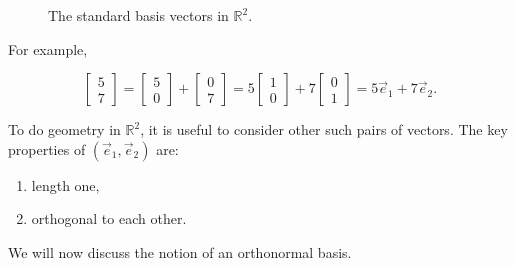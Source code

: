 \begin{figure}[h]
\centering
{}
\caption{The standard basis vectors in $\mathbb{R}^2$.}
\end{figure}

For example,

\[
\begin{bmatrix}
5\\
7
\end{bmatrix}
=
\begin{bmatrix}
5\\
0
\end{bmatrix}
+
\begin{bmatrix}
0\\
7
\end{bmatrix}
=
5
\begin{bmatrix}
1\\
0
\end{bmatrix}
+
7
\begin{bmatrix}
0\\
1
\end{bmatrix}
=
5\vec e_1+7\vec e_2.
\]

To do geometry in $\mathbb{R}^2$, it is useful to consider other such pairs of
vectors. The key properties of $(\vec e_1,\vec e_2)$ are:

\begin{enumerate}
  \item length one,
  \item orthogonal to each other.
\end{enumerate}

We will now discuss the notion of an orthonormal basis.

